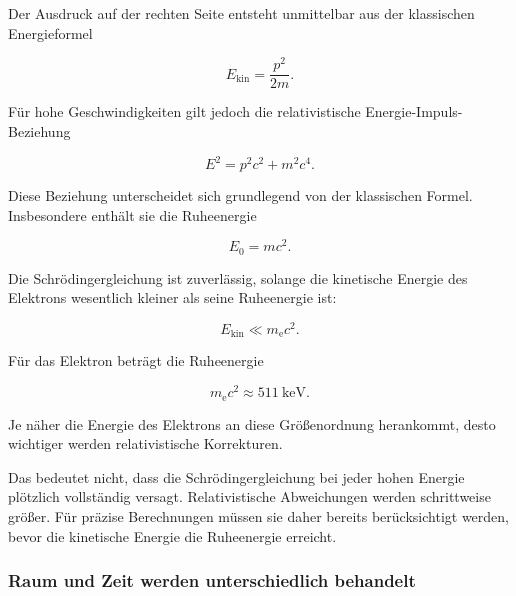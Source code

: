 Der Ausdruck auf der rechten Seite entsteht unmittelbar aus der
klassischen Energieformel

\begin{equation}
	E_{\mathrm{kin}}
	=
	\frac{p^2}{2m}.
\end{equation}

Für hohe Geschwindigkeiten gilt jedoch die relativistische
Energie-Impuls-Beziehung%

\begin{equation}
	E^2
	=
	p^2c^2
	+
	m^2c^4.
	\label{eq:relativistische_energie_impuls_kapitel07}
\end{equation}

Diese Beziehung unterscheidet sich grundlegend von der klassischen
Formel. Insbesondere enthält sie die Ruheenergie%

\begin{equation}
	E_0
	=
	mc^2.
\end{equation}

\begin{PhysicsBox}
	\label{box:nichtrelativistische_naeherung_schroedinger}
	
	Die Schrödingergleichung ist zuverlässig, solange die kinetische
	Energie des Elektrons wesentlich kleiner als seine Ruheenergie ist:
	
	\begin{equation}
		E_{\mathrm{kin}}
		\ll
		m_{\mathrm e}c^2.
	\end{equation}
	
	Für das Elektron beträgt die Ruheenergie
	
	\begin{equation}
		m_{\mathrm e}c^2
		\approx
		\SI{511}{\kilo\electronvolt}.
	\end{equation}
	
	Je näher die Energie des Elektrons an diese Größenordnung herankommt,
	desto wichtiger werden relativistische Korrekturen.
\end{PhysicsBox}

Das bedeutet nicht, dass die Schrödingergleichung bei jeder hohen
Energie plötzlich vollständig versagt. Relativistische Abweichungen
werden schrittweise größer. Für präzise Berechnungen müssen sie daher
bereits berücksichtigt werden, bevor die kinetische Energie die
Ruheenergie erreicht.

\subsubsection*{Raum und Zeit werden unterschiedlich behandelt}

